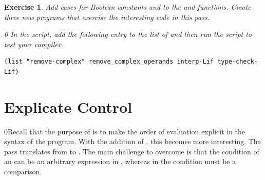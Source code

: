 \documentclass[7x10]{TimesAPriori_MIT}%
\def\racketEd{0}
\def\edition{1}
\newcommand{\racket}[1]{{\if\edition\racketEd{#1}\fi}}
\newtheorem{exercise}[theorem]{Exercise}
\numberwithin{theorem}{chapter}
\numberwithin{definition}{chapter}
\numberwithin{equation}{chapter}
\begin{document}
\begin{exercise}\normalfont\normalsize
%
Add cases for Boolean constants and  to the 
and  functions.
%
Create three new \LangIf{} programs that exercise the interesting
code in this pass.
%
{\if\edition\racketEd    
In the  script, add the following entry to the
list of  and then run the script to test your compiler.
\begin{lstlisting}
(list "remove-complex" remove_complex_operands interp-Lif type-check-Lif)
\end{lstlisting}
\fi}
\end{exercise}


\section{Explicate Control}
\label{sec:explicate-control-Lif}

\racket{Recall that the purpose of  is to
  make the order of evaluation explicit in the syntax of the program.
  With the addition of \key{if}, this becomes more interesting.}
%
The  pass translates from \LangIfANF{} to \LangCIf{}.
%
The main challenge to overcome is that the condition of an 
can be an arbitrary expression in \LangIfANF{}, whereas in \LangCIf{} the
condition must be a comparison.
\end{document}
